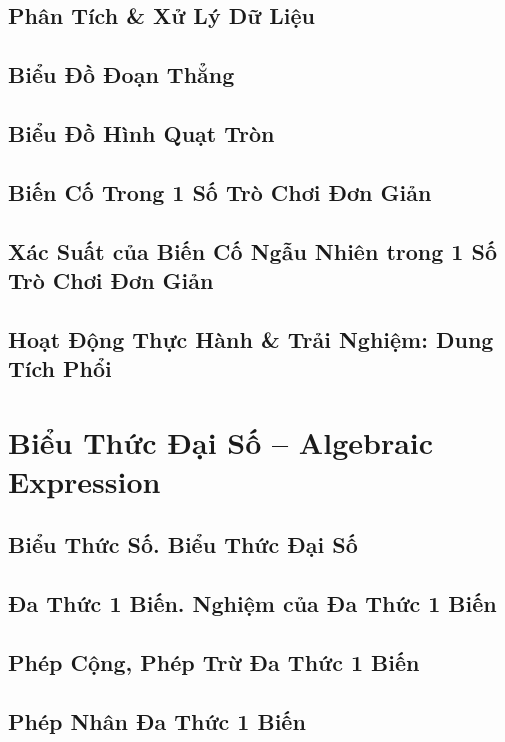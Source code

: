 \documentclass[oneside]{book}
\numberwithin{equation}{section}
\begin{document}
\section{Phân Tích \& Xử Lý Dữ Liệu}

\section{Biểu Đồ Đoạn Thẳng}

\section{Biểu Đồ Hình Quạt Tròn}

\section{Biến Cố Trong 1 Số Trò Chơi Đơn Giản}

\section{Xác Suất của Biến Cố Ngẫu Nhiên trong 1 Số Trò Chơi Đơn Giản}

\section{Hoạt Động Thực Hành \& Trải Nghiệm: Dung Tích Phổi}


\chapter{Biểu Thức Đại Số -- Algebraic Expression}

\section{Biểu Thức Số. Biểu Thức Đại Số}

\section{Đa Thức 1 Biến. Nghiệm của Đa Thức 1 Biến}

\section{Phép Cộng, Phép Trừ Đa Thức 1 Biến}

\section{Phép Nhân Đa Thức 1 Biến}
\end{document}

